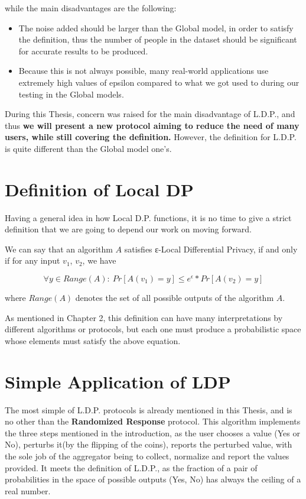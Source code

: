 while the main disadvantages are the following:

\begin{itemize}
    \item The noise added should be larger than the Global model, in order to satisfy the definition, thus the number of people in the dataset should be significant for accurate results to be produced.
    \item Because this is not always possible, many real-world applications use extremely high values of epsilon compared to what we got used to during our testing in the Global models.
\end{itemize}

During this Thesis, concern was raised for the main disadvantage of L.D.P., and thus\textbf{ we will present a new protocol aiming to reduce the need of many users, while still covering the definition.} However, the definition for L.D.P. is quite different than the Global model one's.

\section{Definition of Local DP}

Having a general idea in how Local D.P. functions, it is no time to give a strict definition that we are going to depend our work on moving forward.

We can say that an algorithm $A$ satisfies ε-Local Differential Privacy, if and only if for any input $v_1$, $v_2$, we have

$$ \forall y \in Range(A):\ Pr[A(v_1) = y] \leq e^{\epsilon} * Pr[A(v_2) = y] $$

where $Range(A)$ denotes the set of all possible outputs of the algorithm $A$.

As mentioned in Chapter 2, this definition can have many interpretations by different algorithms or protocols, but each one must produce a probabilistic space whose elements must satisfy the above equation.


\section{Simple Application of LDP}

The most simple of L.D.P. protocols is already mentioned in this Thesis, and is no other than the \textbf{Randomized Response} protocol. This algorithm implements the three steps mentioned in the introduction, as the user chooses a value (Yes or No), perturbs it(by the flipping of the coins), reports the perturbed value, with the sole job of the aggregator being to collect, normalize and report the values provided. It meets the definition of L.D.P., as the fraction of a pair of probabilities in the space of possible outputs (Yes, No) has always the ceiling of a real number. 

